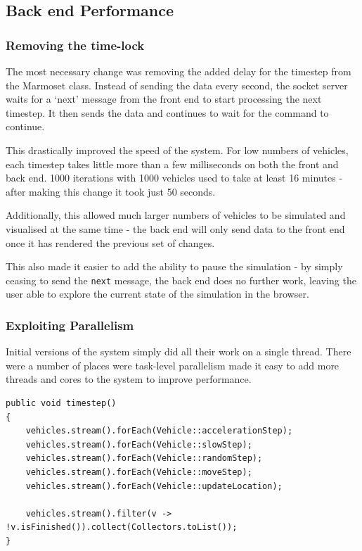 \documentclass[ %
                    author={Alexander Hill},
                supervisor={Dr. Benjamin Sach},
                    degree={MEng},
                     title={MARMOSET},
                  subtitle={Multi-Agent Route Management using Online Simulation for Efficient Transportation},
                      type={research},
                      year={2016} ]{dissertation}
\begin{document}
\subsection{Back end Performance}\label{sec:perf}

\subsubsection{Removing the time-lock}

The most necessary change was removing the added delay for the timestep from the
Marmoset class. Instead of sending the data every second, the socket server
waits for a `next' message from the front end to start processing the next
timestep. It then sends the data and continues to wait for the command to
continue.

This drastically improved the speed of the system. For low numbers of vehicles,
each timestep takes little more than a few milliseconds on both the front and
back end. 1000 iterations with 1000 vehicles used to take at least 16 minutes -
after making this change it took just 50 seconds.

Additionally, this allowed much larger numbers of vehicles to be simulated and
visualised at the same time - the back end will only send data to the front end
once it has rendered the previous set of changes.

This also made it easier to add the ability to pause the simulation - by simply
ceasing to send the \texttt{next} message, the back end does no further work,
leaving the user able to explore the current state of the simulation in the
browser.

\subsubsection{Exploiting Parallelism}

Initial versions of the system simply did all their work on a single thread.
There were a number of places were task-level parallelism made it easy to add
more threads and cores to the system to improve performance.

\begin{minipage}{\linewidth}
\begin{lstlisting}[caption={The single-threaded \texttt{timestep} function},
    label=lst:timestep]
public void timestep()
{
    vehicles.stream().forEach(Vehicle::accelerationStep);
    vehicles.stream().forEach(Vehicle::slowStep);
    vehicles.stream().forEach(Vehicle::randomStep);
    vehicles.stream().forEach(Vehicle::moveStep);
    vehicles.stream().forEach(Vehicle::updateLocation);

    vehicles.stream().filter(v -> !v.isFinished()).collect(Collectors.toList());
}
\end{lstlisting}
\end{minipage}
\end{document}
